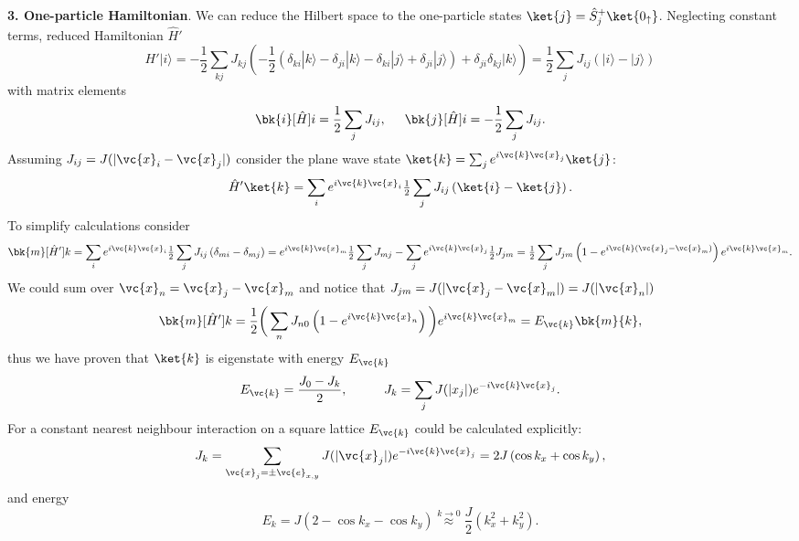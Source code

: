 \textbf{3. One-particle Hamiltonian}. We can reduce the Hilbert space to the one-particle states $\ket{j} = \hat{S}^{+}_{j} \ket{0_{\uparrow}}$. Neglecting constant terms, reduced Hamiltonian $\hat{H}'$
\begin{equation*}
 H'|i\rangle = -\frac{1}{2} \sum_{k j} J_{k j} \left(  - \frac{1}{2} \left( \delta_{ k i } | k \rangle - \delta_{j i} | k\rangle - \delta_{k i} |  j\rangle +  \delta_{j i }| j \rangle     \right) + \delta_{j i} \delta_{k j} | k \rangle   \right)   = \frac{1}{2} \sum_j J_{i j}(|i\rangle-|j\rangle)
\end{equation*}
with  matrix elements
\begin{equation*}
	\bk{i}[\hat{H}]{i} = \frac{1}{2} \sum_j J_{ij},
	\hspace{5 mm} 
	\bk{j}[\hat{H}]{i} = -\frac{1}{2} \sum_j J_{ij}.
\end{equation*}
Assuming $J_{ij} = J(|\vc{x}_i - \vc{x}_j|)$ consider the plane wave state $\ket{k} = \sum_j e^{i \vc{k} \vc{x}_j} \ket{j}$:
\begin{align*}
	\hat{H}' \ket{k} = \sum_i e^{i \vc{k} \vc{x}_i} \tfrac{1}{2} \sum_{j} J_{ij} \left(\ket{i} - \ket{j}\right).
\end{align*}
To simplify calculations consider
\begin{align*}
	\bk{m}[\hat{H}']{k} = \sum_i e^{i \vc{k} \vc{x}_i} \tfrac{1}{2} \sum_{j} J_{ij} \left(\delta_{mi} - \delta_{mj}\right) = e^{i \vc{k} \vc{x}_m} \tfrac{1}{2} \sum_j J_{mj} - \sum_j e^{i \vc{k} \vc{x}_j} \tfrac{1}{2} J_{jm}=  \tfrac{1}{2} \sum_j J_{jm} \left(1 - e^{i \vc{k}(\vc{x}_j - \vc{x}_m)}\right) e^{i \vc{k} \vc{x}_m}.
\end{align*}
We could sum over $\vc{x}_n = \vc{x}_j - \vc{x}_m$ and notice that $J_{jm} = J(|\vc{x}_j - \vc{x}_m|) = J(|\vc{x}_n|)$
\begin{equation*}
	\bk{m}[\hat{H}']{k}  = \frac{1}{2} \bigg(
		\sum_n J_{n0} \left(1-e^{i \vc{k} \vc{x}_n}\right)
	\bigg) e^{i \vc{k} \vc{x}_m} = E_{\vc{k}} \bk{m}{k},
\end{equation*}
thus we have proven that $\ket{k}$ is eigenstate with energy $E_{\vc{k}}$
\begin{equation*}
	E_{\vc{k}} = \frac{J_0 - J_k}{2},
	\hspace{10 mm} 
	J_k = \sum_j J(|x_j|) e^{-i \vc{k} \vc{x}_j}.
\end{equation*}
For a constant nearest neighbour interaction on a square lattice $E_{\vc{k}}$ could be calculated explicitly:
\begin{equation*}
	J_k = \sum_{\vc{x}_j = \pm \vc{e}_{x,y}} J(|\vc{x}_j|) e^{- i \vc{k} \vc{x}_j} = 2 J\left(
		\cos k_x + \cos k_y
	\right),
\end{equation*}
and energy
\begin{equation*}
	E_k = J\left(2 - \cos k_x - \cos k_y \right) \overset{k \to 0}{\approx} \frac{J}{2}\left(k_x^2 + k_y^2\right).
\end{equation*}
